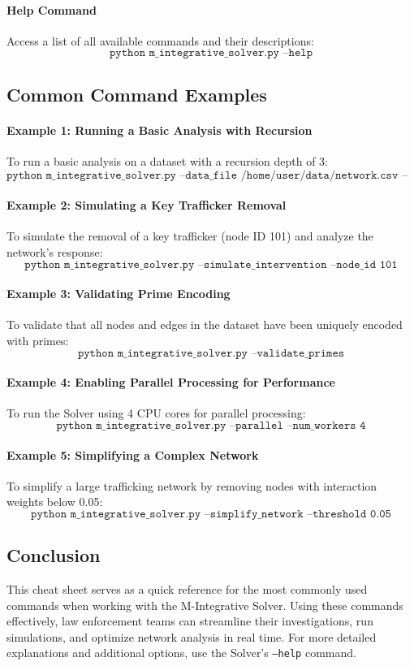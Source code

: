\documentclass[%
 preprint, linenumbers,
 amsmath,amssymb,
 aps, physrev,
]{revtex4-2}
\begin{document}
\paragraph{Help Command}
Access a list of all available commands and their descriptions:
\[
\texttt{python m\_integrative\_solver.py --help}
\]

\subsection*{Common Command Examples}

\paragraph{Example 1: Running a Basic Analysis with Recursion}
To run a basic analysis on a dataset with a recursion depth of 3:
\[
\texttt{python m\_integrative\_solver.py --data\_file /home/user/data/network.csv --recursion\_depth 3}
\]

\paragraph{Example 2: Simulating a Key Trafficker Removal}
To simulate the removal of a key trafficker (node ID 101) and analyze the network’s response:
\[
\texttt{python m\_integrative\_solver.py --simulate\_intervention --node\_id 101}
\]

\paragraph{Example 3: Validating Prime Encoding}
To validate that all nodes and edges in the dataset have been uniquely encoded with primes:
\[
\texttt{python m\_integrative\_solver.py --validate\_primes}
\]

\paragraph{Example 4: Enabling Parallel Processing for Performance}
To run the Solver using 4 CPU cores for parallel processing:
\[
\texttt{python m\_integrative\_solver.py --parallel --num\_workers 4}
\]

\paragraph{Example 5: Simplifying a Complex Network}
To simplify a large trafficking network by removing nodes with interaction weights below 0.05:
\[
\texttt{python m\_integrative\_solver.py --simplify\_network --threshold 0.05}
\]

\subsection*{Conclusion}

This cheat sheet serves as a quick reference for the most commonly used commands when working with the M-Integrative Solver. Using these commands effectively, law enforcement teams can streamline their investigations, run simulations, and optimize network analysis in real time. For more detailed explanations and additional options, use the Solver’s \texttt{--help} command.
\end{document}
